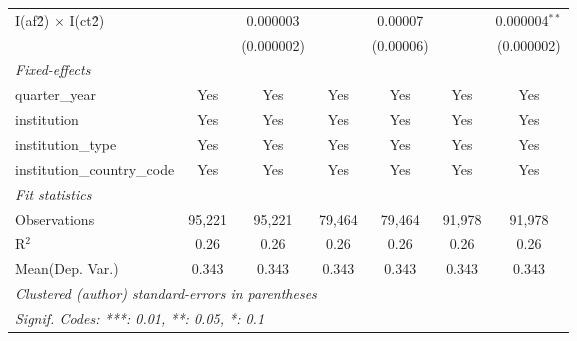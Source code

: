 \begin{tabular}{lcccccc}
   I(af\^2) $\times$ I(ct\^2)         &               & 0.000003        &               & 0.00007         &               & 0.000004$^{**}$\\   
                                      &               & (0.000002)      &               & (0.00006)       &               & (0.000002)\\   
   \midrule
   \emph{Fixed-effects}\\
   quarter\_year                      & Yes           & Yes             & Yes           & Yes             & Yes           & Yes\\  
   institution                        & Yes           & Yes             & Yes           & Yes             & Yes           & Yes\\  
   institution\_type                  & Yes           & Yes             & Yes           & Yes             & Yes           & Yes\\  
   institution\_country\_code         & Yes           & Yes             & Yes           & Yes             & Yes           & Yes\\  
   \midrule
   \emph{Fit statistics}\\
   Observations                       & 95,221        & 95,221          & 79,464        & 79,464          & 91,978        & 91,978\\  
   R$^2$                              & 0.26          & 0.26            & 0.26          & 0.26            & 0.26          & 0.26\\  
Mean(Dep. Var.) & 0.343 & 0.343 & 0.343 & 0.343 & 0.343 & 0.343 \\
   \midrule \midrule
   \multicolumn{7}{l}{\emph{Clustered (author) standard-errors in parentheses}}\\
   \multicolumn{7}{l}{\emph{Signif. Codes: ***: 0.01, **: 0.05, *: 0.1}}\\
\end{tabular}
\par\endgroup
